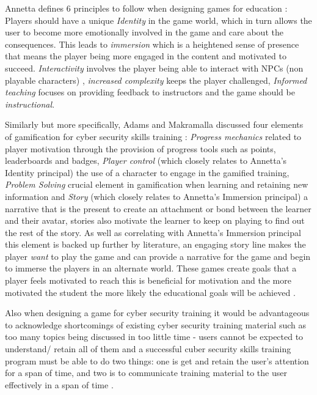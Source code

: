 \documentclass[12pt,a4paper]{article}
\begin{document}
Annetta defines 6 principles to follow when designing games for education \cite{annetta2010s1}: Players should have a unique \emph{Identity} in the game world, which in turn allows the user to become more emotionally involved in the game and care about the consequences. This leads to \emph{immersion} which is a heightened sense of presence that means the player being more engaged in the content and motivated to succeed. \emph{Interactivity} involves the player being able to interact with NPCs (non playable characters) , \emph{increased complexity} keeps the player challenged, \emph{Informed teaching} focuses on providing feedback to instructors and the game should be \emph{instructional}. 

Similarly but more specifically, Adams and Makramalla discussed four elements of gamification for cyber security skills training \cite{adams2015cybersecurity1}: \emph{Progress mechanics} related to player motivation through the provision of progress tools such as points, leaderboards and badges, \emph{Player control} (which closely relates to Annetta's Identity principal) the use of a character to engage in the gamified training, \emph{Problem Solving} crucial element in gamification when learning and retaining new information and \emph{Story} (which closely relates to Annetta's Immersion principal) a narrative that is the present to create an attachment or bond between the learner and their avatar, stories also motivate the learner to keep on playing to find out the rest of the story. As well as correlating with Annetta's Immersion principal this element is backed up further by literature, an engaging story line makes the player \emph{want} to play the game \cite{buchanan2011blending1} and can provide a narrative for the game and begin to immerse the players in an alternate world. These games create goals that a player feels motivated to reach \cite{nagarajan2012exploring3} this is beneficial for motivation and the more motivated the student the more likely the educational goals will be achieved \cite{albert2010high1}.   

Also when designing a game for cyber security training it would be advantageous to acknowledge shortcomings of existing cyber security training material such as too many topics being discussed in too little time - users cannot be expected to understand/ retain all of them and a successful cuber security skills training program must be able to do two things: one is get and retain the user's attention for a span of time, and two is to communicate training material to the user effectively in a span of time \cite{nagarajan2012exploring5}. 
\end{document}
